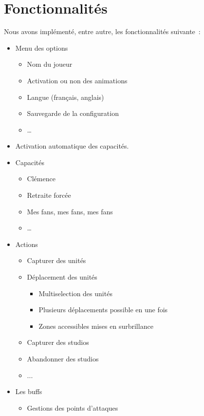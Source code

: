 \chapter{Fonctionnalités}

Nous avons implémenté, entre autre, les fonctionnalités suivante :
\begin{itemize}
    \item Menu des options
    \begin{itemize}
        \item Nom du joueur
        \item Activation ou non des animations
        \item Langue (français, anglais)
        \item Sauvegarde de la configuration
        \item …
    \end{itemize}
    \item Activation automatique des capacités.
    \item Capacités
    \begin{itemize}
        \item Clémence
        \item Retraite forcée
        \item Mes fans, mes fans, mes fans
        \item …
    \end{itemize}
    \item Actions
    \begin{itemize}
        \item Capturer des unités
        \item Déplacement des unités
        \begin{itemize}
            \item Multiselection des unités
            \item Plusieurs déplacements possible en une fois
            \item Zones accessibles mises en surbrillance
        \end{itemize}
        \item Capturer des studios
        \item Abandonner des studios
        \item ...
    \end{itemize}
    \item Les buffs
    \begin{itemize}
        \item Gestions des points d'attaques

\end{itemize}
\end{itemize}
